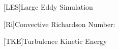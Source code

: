 \begin{acronym}
[LES]{Large Eddy Simulation}
\end{acronym}

\begin{acronym}
[Ri]{Convective Richardson Number:}
\end{acronym}

\begin{acronym}
[TKE]{Turbulence Kinetic Energy}
\end{acronym}




\endinput




% 
